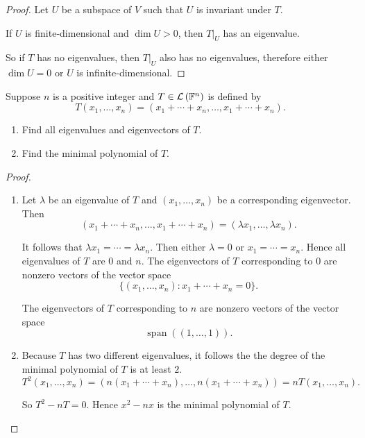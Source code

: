 \begin{proof}
    Let $U$ be a subspace of $V$ such that $U$ is invariant under $T$.

    If $U$ is finite-dimensional and $\dim U > 0$, then $T\vert_{U}$ has an eigenvalue.

    So if $T$ has no eigenvalues, then $T\vert_{U}$ also has no eigenvalues, therefore either $\dim U = 0$ or $U$ is infinite-dimensional.
\end{proof}
\newpage

\begin{exercise}
    Suppose $n$ is a positive integer and $T\in\mathcal{L}\left({\mathbb{F}^{n}}\right)$ is defined by
    \[
        T(x_{1}, \ldots, x_{n}) = (x_{1} + \cdots + x_{n}, \ldots, x_{1} + \cdots + x_{n}).
    \]

    \begin{enumerate}[label={(\alph*)}]
        \item Find all eigenvalues and eigenvectors of $T$.
        \item Find the minimal polynomial of $T$.
    \end{enumerate}
\end{exercise}

\begin{proof}
    \begin{enumerate}[label={(\alph*)}]
        \item Let $\lambda$ be an eigenvalue of $T$ and $(x_{1}, \ldots, x_{n})$ be a corresponding eigenvector. Then
              \[
                  (x_{1} + \cdots + x_{n}, \ldots, x_{1} + \cdots + x_{n}) = (\lambda x_{1}, \ldots, \lambda x_{n}).
              \]

              It follows that $\lambda x_{1} = \cdots = \lambda x_{n}$. Then either $\lambda = 0$ or $x_{1} = \cdots = x_{n}$. Hence all eigenvalues of $T$ are $0$ and $n$. The eigenvectors of $T$ corresponding to $0$ are nonzero vectors of the vector space
              \[
                  \{ (x_{1}, \ldots, x_{n}): x_{1} + \cdots + x_{n} = 0 \}.
              \]

              The eigenvectors of $T$ corresponding to $n$ are nonzero vectors of the vector space
              \[
                  \operatorname{span}((1, \ldots, 1)).
              \]
        \item Because $T$ has two different eigenvalues, it follows the the degree of the minimal polynomial of $T$ is at least $2$.
              \[
                  T^{2}(x_{1}, \ldots, x_{n}) = (n(x_{1} + \cdots + x_{n}), \ldots, n(x_{1} + \cdots + x_{n})) = nT(x_{1}, \ldots, x_{n}).
              \]

              So $T^{2} - nT = 0$. Hence $x^{2} - nx$ is the minimal polynomial of $T$.
    \end{enumerate}
\end{proof}
\newpage

